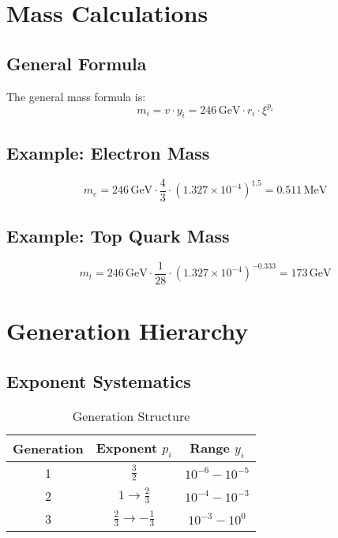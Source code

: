 \documentclass[12pt,a4paper]{article}
\newcommand{\xipar}{\xi}
\begin{document}
	\section{Mass Calculations}
	
	\subsection{General Formula}
	
	The general mass formula is:
	\begin{equation}
		m_i = v \cdot y_i = 246\,\text{GeV} \cdot r_i \cdot \xipar^{p_i}
	\end{equation}
	
	\subsection{Example: Electron Mass}
	
	\begin{equation}
		m_e = 246\,\text{GeV} \cdot \frac{4}{3} \cdot (1.327 \times 10^{-4})^{1.5} = 0.511\,\text{MeV}
	\end{equation}
	
	\subsection{Example: Top Quark Mass}
	
	\begin{equation}
		m_t = 246\,\text{GeV} \cdot \frac{1}{28} \cdot (1.327 \times 10^{-4})^{-0.333} = 173\,\text{GeV}
	\end{equation}
	
	\section{Generation Hierarchy}
	
	\subsection{Exponent Systematics}
	
	\begin{table}[H]
		\centering
		\caption{Generation Structure}
		\begin{tabular}{@{}ccc@{}}
			\toprule
			\textbf{Generation} & \textbf{Exponent} $p_i$ & \textbf{Range} $y_i$ \\
			\midrule
			1 & $\frac{3}{2}$ & $10^{-6} - 10^{-5}$ \\
			2 & $1 \rightarrow \frac{2}{3}$ & $10^{-4} - 10^{-3}$ \\
			3 & $\frac{2}{3} \rightarrow -\frac{1}{3}$ & $10^{-3} - 10^0$ \\
			\bottomrule
		\end{tabular}
	\end{table}
	
\end{document}
